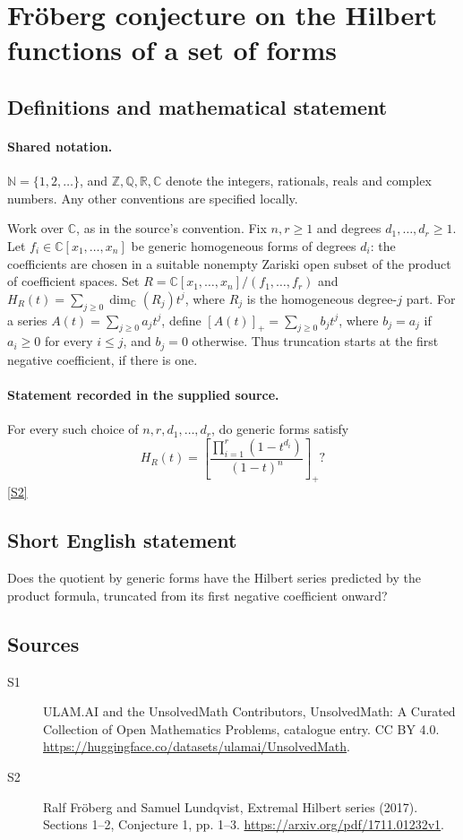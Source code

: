 \documentclass[11pt]{article}
\newcommand{\sref}[2]{\hyperlink{source:#1:#2}{[S#2]}}
\begin{document}
\section{Fröberg conjecture on the Hilbert functions of a set of forms}\label{statement}

\subsection{Definitions and mathematical statement}

\paragraph{Shared notation.}$\mathbb N=\{1,2,\ldots\}$, and $\mathbb Z,\mathbb Q,\mathbb R,\mathbb C$ denote the integers, rationals, reals and complex numbers. Any other conventions are specified locally.


Work over $\mathbb C$, as in the source's convention. Fix $n,r\geq1$ and degrees $d_1,\ldots,d_r\geq1$. Let $f_i\in\mathbb C[x_1,\ldots,x_n]$ be generic homogeneous forms of degrees $d_i$: the coefficients are chosen in a suitable nonempty Zariski open subset of the product of coefficient spaces. Set $R=\mathbb C[x_1,\ldots,x_n]/(f_1,\ldots,f_r)$ and $H_R(t)=\sum_{j\geq0}\dim_{\mathbb C}(R_j)t^j$, where $R_j$ is the homogeneous degree-$j$ part. For a series $A(t)=\sum_{j\geq0}a_jt^j$, define $[A(t)]_+=\sum_{j\geq0}b_jt^j$, where $b_j=a_j$ if $a_i\geq0$ for every $i\leq j$, and $b_j=0$ otherwise. Thus truncation starts at the first negative coefficient, if there is one.
\paragraph{Statement recorded in the supplied source.}
For every such choice of $n,r,d_1,\ldots,d_r$, do generic forms satisfy
\[H_R(t)=\left[\frac{\prod_{i=1}^r(1-t^{d_i})}{(1-t)^n}\right]_+?\] \sref{statement}{2}
\subsection{Short English statement}
Does the quotient by generic forms have the Hilbert series predicted by the product formula, truncated from its first negative coefficient onward?
\subsection{Sources}
\begin{description}
\item[\hypertarget{source:statement:1}{S1}] ULAM.AI and the UnsolvedMath Contributors, UnsolvedMath: A Curated Collection of Open Mathematics Problems, catalogue entry. CC BY 4.0. \url{https://huggingface.co/datasets/ulamai/UnsolvedMath}.
\item[\hypertarget{source:statement:2}{S2}] Ralf Fröberg and Samuel Lundqvist, Extremal Hilbert series (2017). Sections 1–2, Conjecture 1, pp. 1–3. \url{https://arxiv.org/pdf/1711.01232v1}.
\end{description}
\label{end:statement}
\end{document}
